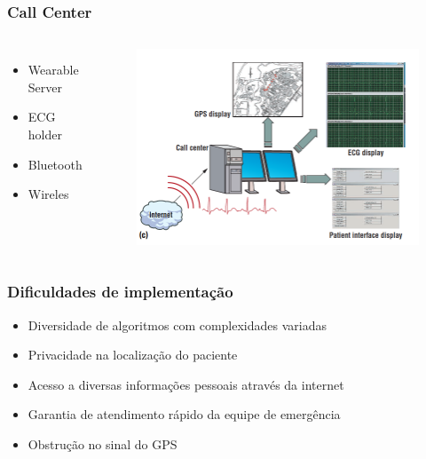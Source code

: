 \documentclass{beamer}
\begin{document}

\begin{frame}
\frametitle{Call Center}

\begin{columns}[c] %

	\begin{itemize}
		\item Wearable Server
		\item ECG holder
		\item Bluetooth
		\item Wireles
	\end{itemize}

	\begin{figure}
		\includegraphics[width=1\linewidth]{figura3-call-center.png}
	\end{figure}

\end{columns}

\end{frame}


\begin{frame}
\frametitle{Dificuldades de implementação}

	\begin{itemize}
		\item Diversidade de algoritmos com complexidades variadas
		\item Privacidade na localização do paciente
		\item Acesso a diversas informações pessoais através da internet
		\item Garantia de atendimento rápido da equipe de emergência
		\item Obstrução no sinal do GPS
	\end{itemize}
\end{frame}
\end{document}
